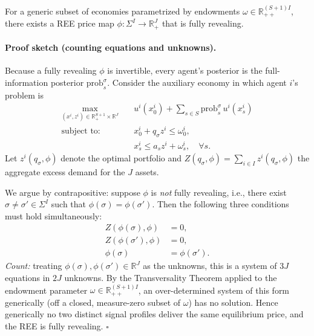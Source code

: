 \begin{theorem}[Radner 1979]
For a generic subset of economies parametrized by endowments $\omega \in \mathbb{R}^{(S+1)I}_{++}$, there exists a REE price map $\phi: \Sigma^I \to \mathbb{R}^J_+$ that is fully revealing.
\end{theorem}

\paragraph{Proof sketch (counting equations and unknowns).}
Because a fully revealing $\phi$ is invertible, every agent's posterior is the full-information posterior $\text{prob}^\sigma_s$. Consider the auxiliary economy in which agent $i$'s problem is
\begin{align*}
    \max_{(x^i, z^i) \in \mathbb{R}^{S+1}_+ \times \mathbb{R}^J} \quad & u^i(x_0^i) + \sum_{s \in S} \text{prob}^\sigma_s \, u^i(x_s^i) \\
    \text{subject to: } \quad & x_0^i + q_\sigma z^i \leq \omega_0^i, \\
                              & x_s^i \leq a_s z^i + \omega_s^i, \quad \forall s.
\end{align*}
Let $z^i(q_\sigma, \phi)$ denote the optimal portfolio and
$Z(q_\sigma, \phi) = \sum_{i \in I} z^i(q_\sigma, \phi)$
the aggregate excess demand for the $J$ assets.

We argue by contrapositive: suppose $\phi$ is \emph{not} fully revealing, i.e., there exist $\sigma \neq \sigma' \in \Sigma^I$ such that $\phi(\sigma) = \phi(\sigma')$. Then the following three conditions must hold simultaneously:
\begin{align*}
    Z(\phi(\sigma),  \phi)   &= 0, \\
    Z(\phi(\sigma'), \phi) &= 0, \\
    \phi(\sigma) &= \phi(\sigma').
\end{align*}
\emph{Count:} treating $\phi(\sigma), \phi(\sigma') \in \mathbb{R}^J$ as the unknowns, this is a system of $3J$ equations in $2J$ unknowns. By the Transversality Theorem applied to the endowment parameter $\omega \in \mathbb{R}^{(S+1)I}_{++}$, an over-determined system of this form generically (off a closed, measure-zero subset of $\omega$) has no solution. Hence generically no two distinct signal profiles deliver the same equilibrium price, and the REE is fully revealing. \hfill $\square$

